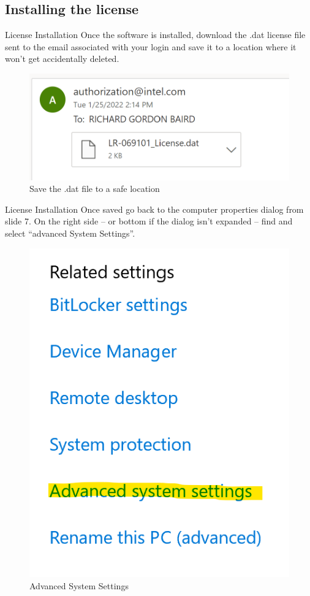 \documentclass[fleqn]{beamer}
\newcommand{\quotes}[1]{``#1''}
\begin{document}
\subsection{Installing the license}
\begin{frame}{License Installation}
    Once the software is installed, download the .dat license file sent to the email associated with your login and save it to a location where it won't get accidentally deleted.
    \begin{figure}
        \centering
        \includegraphics[scale=.8]{figures/licensedat.png}
        \caption{Save the .dat file to a safe location}
        \label{fig:my_label}
    \end{figure}
\end{frame}
\begin{frame}{License Installation}
   Once saved go back to the computer properties dialog from slide 7. On the right side -- or bottom if the dialog isn't expanded -- find and select \quotes{advanced System Settings}.
   \begin{figure}
       \centering
       \includegraphics[scale=.5]{figures/advancedsettings.png}
       \caption{Advanced System Settings}
       \label{fig:my_label}
   \end{figure}
\end{frame}
\end{document}
